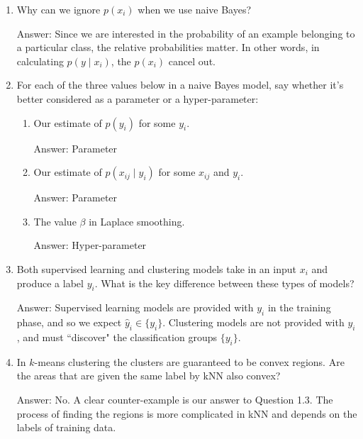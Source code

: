 \documentclass{article}
\newenvironment{answer}{\par\begingroup\color{gre}Answer: }{\endgroup}
\begin{document}
\begin{enumerate}
        \item Why can we ignore $p(x_i)$ when we use naive Bayes?
        \begin{answer}
            Since we are interested in the probability of an example belonging to a particular class, the relative probabilities matter. In other words, in calculating $p(y\mid x_i)$, the $p(x_i)$ cancel out.
        \end{answer}

        \item For each of the three values below in a naive Bayes model, say whether it's better considered as a parameter or a hyper-parameter:
        \begin{enumerate}
            \item Our estimate of $p(y_i)$ for some $y_i$.
            \begin{answer}
                Parameter
            \end{answer}
            \item Our estimate of $p(x_{ij} \mid y_i)$ for some $x_{ij}$ and $y_i$.
            \begin{answer}
                Parameter
            \end{answer}
            \item The value $\beta$ in Laplace smoothing.
            \begin{answer}
                Hyper-parameter
            \end{answer}
        \end{enumerate}

        \item Both supervised learning and clustering models take in an input $x_i$ and produce a label $y_i$. What is the key difference between these types of models?
        \begin{answer}
            Supervised learning models are provided with $y_i$ in the training phase, and so we expect $\hat y_i \in \{y_i\}$. Clustering models are not provided with $y_i$, and must ``discover" the classification groups $\{y_i\}$.
        \end{answer}

        \item In $k$-means clustering the clusters are guaranteed to be convex regions. Are the areas that are given the same label by kNN also convex?
        \begin{answer}
            No. A clear counter-example is our answer to Question 1.3. The process of finding the regions is more complicated in kNN and depends on the labels of training data.
        \end{answer}
    \end{enumerate}
\end{document}
